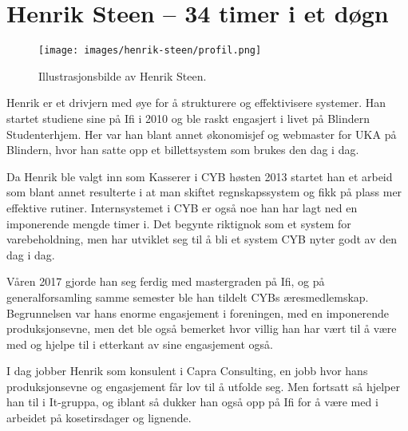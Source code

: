 \chapter[Henrik Steen]{Henrik Steen -- 34 timer i et døgn}

\author{Skrevet av Arne Hassel}

\begin{wrapfigure}{l}{7cm}
	\vspace{-60pt}
	\centering
	\texttt{[image: images/henrik-steen/profil.png]}
	\label{fig:morten-daehlen}
	\caption{Illustrasjonsbilde av Henrik Steen.}
\end{wrapfigure}

Henrik er et drivjern med øye for å strukturere og effektivisere systemer. Han startet studiene sine på Ifi i 2010 og ble raskt engasjert i livet på Blindern Studenterhjem. Her var han blant annet økonomisjef og webmaster for UKA på Blindern, hvor han satte opp et billettsystem som brukes den dag i dag.

Da Henrik ble valgt inn som Kasserer i CYB høsten 2013 startet han et arbeid som blant annet resulterte i at man skiftet regnskapssystem og fikk på plass mer effektive rutiner. Internsystemet i CYB er også noe han har lagt ned en imponerende mengde timer i. Det begynte riktignok som et system for varebeholdning, men har utviklet seg til å bli et system CYB nyter godt av den dag i dag.

Våren 2017 gjorde han seg ferdig med mastergraden på Ifi, og på generalforsamling samme semester ble han tildelt CYBs æresmedlemskap. Begrunnelsen var hans enorme engasjement i foreningen, med en imponerende produksjonsevne, men det ble også bemerket hvor villig han har vært til å være med og hjelpe til i etterkant av sine engasjement også.

I dag jobber Henrik som konsulent i Capra Consulting, en jobb hvor hans produksjonsevne og engasjement får lov til å utfolde seg. Men fortsatt så hjelper han til i It-gruppa, og iblant så dukker han også opp på Ifi for å være med i arbeidet på kosetirsdager og lignende.
